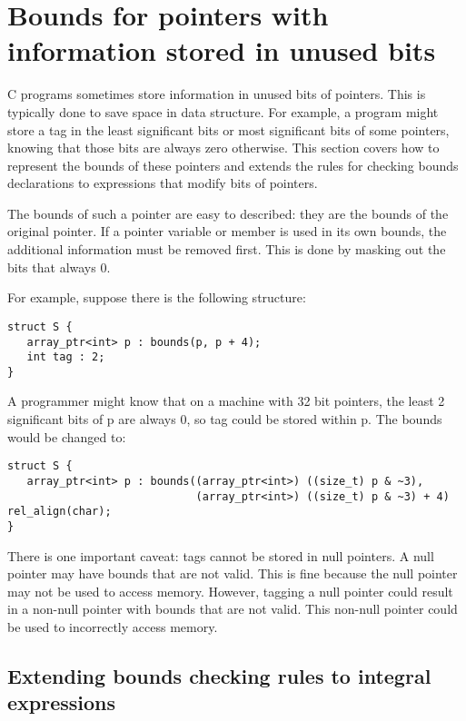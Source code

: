 \section{Bounds for pointers with information stored in unused bits}\label{bounds-for-pointers-with-information-stored-in-unused-bits}

C programs sometimes store information in unused bits of pointers. This
is typically done to save space in data structure. For example, a
program might store a tag in the least significant bits or most
significant bits of some pointers, knowing that those bits are always
zero otherwise. This section covers how to represent the bounds of these
pointers and extends the rules for checking bounds declarations to
expressions that modify bits of pointers.

The bounds of such a pointer are easy to described: they are the bounds
of the original pointer. If a pointer variable or member is used in its
own bounds, the additional information must be removed first. This is
done by masking out the bits that always 0.

For example, suppose there is the following structure:

\begin{verbatim}
struct S {
   array_ptr<int> p : bounds(p, p + 4);
   int tag : 2;
}
\end{verbatim}

A programmer might know that on a machine with 32 bit pointers, the
least 2 significant bits of p are always 0, so tag could be stored
within p. The bounds would be changed to:

\begin{verbatim}
struct S {
   array_ptr<int> p : bounds((array_ptr<int>) ((size_t) p & ~3), 
                             (array_ptr<int>) ((size_t) p & ~3) + 4) rel_align(char);
}
\end{verbatim}

There is one important caveat: tags cannot be stored in null pointers. A
null pointer may have bounds that are not valid. This is fine because
the null pointer may not be used to access memory. However, tagging a
null pointer could result in a non-null pointer with bounds that are not
valid. This non-null pointer could be used to incorrectly access memory.

\subsection{Extending bounds checking rules to integral
expressions}\label{extending-bounds-checking-rules-to-integral-expressions}

